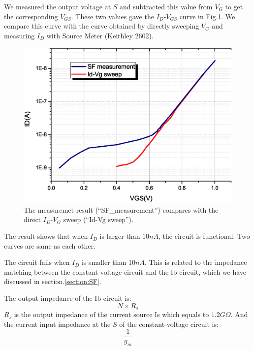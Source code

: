 We measured the output voltage at $S$ and subtracted this value from $V_G$ to get the corresponding $V_{GS}$.
These two values gave the $I_D$-$V_{GS}$ curve in Fig.\ref{fig:SF_result}.
We compare this curve with the curve obtained by directly sweeping $V_G$ and measuring $I_D$ with Source Meter (Keithley 2602).

\begin{figure}[!htb]
   \centering
   \includegraphics[width=1\textwidth]{images/chapter4/SF.eps}
   \caption{The measuremet result (``SF\_measurement'') compares with the direct $I_D$-$V_G$ sweep (``Id-Vg sweep'').}
   \label{fig:SF_result}
\end{figure}

The result shows that when $I_D$ is larger than $10n A$, the circuit is functional.
Two curves are same as each other.

The circuit fails when $I_D$ is smaller than $10n A$.
This is related to the impedance matching between the constant-voltage circuit and the Ib circuit, which we have discussed in section.\ref{section:SF}.

The output impedance of the Ib circuit is:
\begin{equation} \label{eq:rcs2_again}
    N\times R_s
\end{equation}
$R_s$ is the output impedance of the current source Is which equals to $1.2G\Omega$.
And the current input impedance at the $S$ of the constant-voltage circuit is:
\begin{equation} \label{eq:rsf2_again}
    \frac{1}{g_m}
\end{equation}

